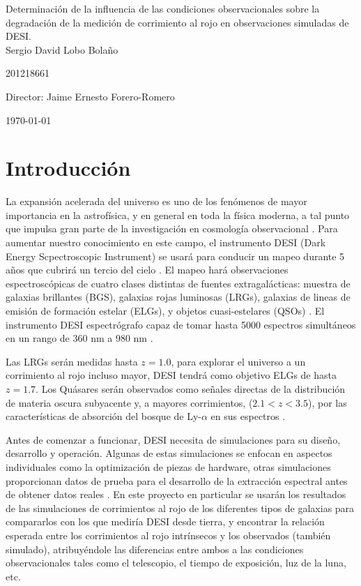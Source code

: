 \documentclass[12pt]{article}
\begin{document}
\begin{center}
\huge
Determinación de la influencia de las condiciones observacionales sobre la degradación de la medici\'on de corrimiento al rojo en observaciones simuladas de DESI.\\
\vspace{3mm}
\Large Sergio David Lobo Bolaño

\large
201218661

\vspace{2mm}
\Large
Director: Jaime Ernesto Forero-Romero


\vspace{2mm}

\today
\end{center}


\section{Introducción}

La expansión acelerada del universo es uno de los fenómenos de mayor
importancia en la astrofísica, y en general en toda la física moderna,
a tal punto que impulsa gran parte de la investigación en cosmología
observacional \cite{Nord:2016plv}. Para aumentar nuestro conocimiento
en este campo, el instrumento DESI (Dark Energy Scpectroscopic
Instrument) se usará para conducir un mapeo durante 5 años que cubrirá
un tercio del cielo \cite{Aghamousa:2016zmz}. El mapeo hará observaciones
espectroscópicas de cuatro clases distintas de fuentes
extragalácticas:   muestra de galaxias brillantes (BGS), galaxias rojas luminosas (LRGs), galaxias de lineas de emisión de formación estelar (ELGs), y objetos cuasi-estelares (QSOs) \cite{Aghamousa:2016zmz}. El instrumento DESI espectrógrafo capaz de tomar hasta 5000 espectros simultáneos en un rango de 360 nm a 980 nm \cite{Aghamousa:2016sne}. 

Las LRGs serán medidas hasta $z = 1.0$, para explorar el universo a un corrimiento al rojo incluso mayor, DESI tendrá como objetivo ELGs de hasta $z = 1.7$. Los Quásares serán observados como señales directas de la distribución de materia oscura subyacente y, a mayores corrimientos, ($2.1<z<3.5$), por las características de absorción del bosque de Ly-$\alpha$ en sus espectros \cite{Aghamousa:2016zmz}. 

Antes de comenzar a funcionar, DESI necesita de simulaciones para su
diseño, desarrollo y operación. Algunas de estas simulaciones se
enfocan en aspectos individuales como la optimización de piezas de
hardware, otras simulaciones proporcionan datos de prueba para el
desarrollo de la extracción espectral antes de obtener datos reales
\cite{Aghamousa:2016sne}. En este proyecto en particular se usarán los
resultados de las simulaciones de corrimientos al rojo de los
diferentes tipos de galaxias para compararlos con los que mediría DESI
desde tierra, y encontrar la relación esperada entre los corrimientos
al rojo intr\'insecos y los observados (también simulado),
atribuyéndole las diferencias entre  ambos a las condiciones
observacionales tales como el telescopio, el tiempo de exposición, luz
de la luna, etc.   
\end{document}

